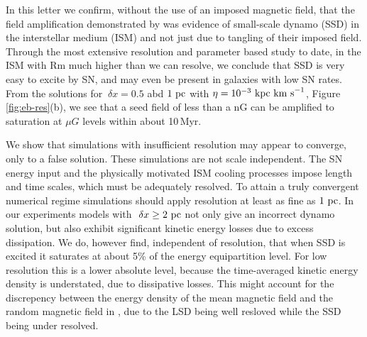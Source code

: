 \documentclass[preprint2]{aastex63}
\newcommand\kpc{~ {\rm kpc}}
\newcommand\pc{~ {\rm pc}}
\newcommand\dx{~ {\delta x}}
\newcommand\kms{~ {\rm km~ s}^{-1}}
\begin{document}
In this letter we confirm, without the use of an imposed magnetic field, that
the field amplification demonstrated by \citet{BKMM04} was evidence of 
small-scale dynamo (SSD) in the interstellar medium (ISM) and not just due to
tangling of their imposed field.
Through the most extensive resolution and parameter based study to date,
in the ISM with Rm much higher than we can resolve, we conclude that SSD is
very easy to excite by SN, and may even be present in galaxies with
low SN rates.
From the solutions for $\dx=0.5$ abd $1\pc$ with $\eta=10^{-3}\kpc\kms$, 
Figure\,\ref{fig:eb-res}(b), 
we see that a seed field of less than a nG can be amplified to saturation at
$\mu G$ levels within about 10\,Myr.
%

We show that simulations with insufficient resolution may appear to converge, 
only to a false solution.
These simulations are not scale independent.
The SN energy input and the physically motivated ISM cooling processes impose
length and time scales, which must be adequately resolved.
To attain a truly convergent numerical regime simulations should apply 
resolution at least as fine as $1\pc$.
In our experiments models with $\dx\geq2\pc$ not only give an incorrect dynamo
solution, but also exhibit significant kinetic energy losses due to excess
dissipation.
%
We do, however find, independent of resolution, that when SSD is excited it
saturates at about 5\% of the energy equipartition level.
For low resolution this is a lower absolute level, because the time-averaged
kinetic energy density is understated, due to dissipative losses.
This might account for the discrepency between the energy density of the mean
magnetic field and the random magnetic field in \citet{Gent:2013b}, due to the
LSD being well resloved while the SSD being under resolved.
\end{document}
